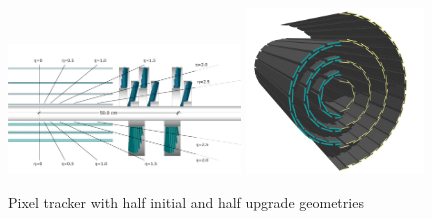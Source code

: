 \begin{figure}[ht!]
\centering
    \includegraphics[width=0.55\textwidth]{images/TrackerUpgradeXSec.png}
     \includegraphics[width=0.42\textwidth]{images/TrackerUpgradeBarrel.png}          
    \caption{Pixel tracker with half initial and half upgrade geometries~\cite{1742-6596-513-2-022032}}
    \label{fig:pixel}
\end{figure}


